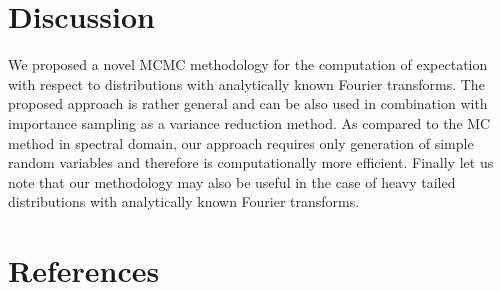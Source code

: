 \documentclass[preprint, 3p, authoryear]{elsarticle}
\newcommand{\E}{\mathsf{E}}
\newcommand{\Cov}{\operatorname{Cov}}
\newcommand{\R}{\mathbb R}
\theoremstyle{definition}
\begin{document}
\section{Discussion}
\label{sec:disc}
We proposed a novel MCMC  methodology for the computation of expectation with respect to distributions with analytically known Fourier transforms. The proposed approach is rather general and can be also used in combination with importance sampling as a variance reduction method. As compared to the  MC method in spectral domain, our approach requires only generation of simple random variables and therefore is computationally more efficient.  Finally let us note that our methodology may also be useful in the case of heavy tailed distributions with analytically known Fourier transforms.

\section*{References}
 

%
%
\end{document}
